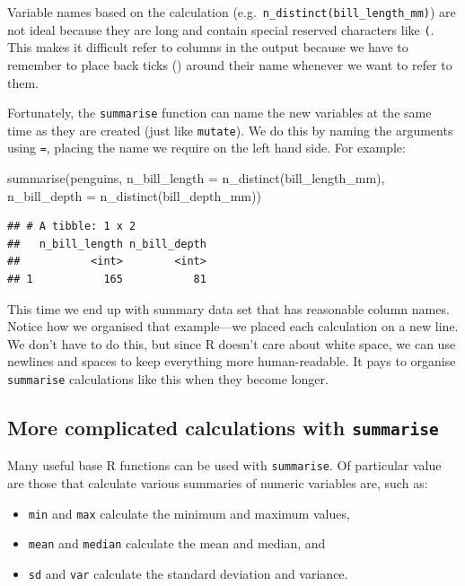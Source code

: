 \documentclass[
]{book}
\newenvironment{Shaded}{\begin{snugshade}}{\end{snugshade}}
\newcommand{\AttributeTok}[1]{\textcolor[rgb]{0.77,0.63,0.00}{#1}}
\newcommand{\FunctionTok}[1]{\textcolor[rgb]{0.00,0.00,0.00}{#1}}
\newcommand{\NormalTok}[1]{#1}
\providecommand{\tightlist}{%
  \setlength{\itemsep}{0pt}\setlength{\parskip}{0pt}}
\begin{document}
Variable names based on the calculation (e.g.~\texttt{n\_distinct(bill\_length\_mm)}) are not ideal because they are long and contain special reserved characters like \texttt{(}. This makes it difficult refer to columns in the output because we have to remember to place back ticks (\texttt{\textasciigrave{}}) around their name whenever we want to refer to them.

Fortunately, the \texttt{summarise} function can name the new variables at the same time as they are created (just like \texttt{mutate}). We do this by naming the arguments using \texttt{=}, placing the name we require on the left hand side. For example:

\begin{Shaded}
\begin{Highlighting}[]
\FunctionTok{summarise}\NormalTok{(penguins, }
          \AttributeTok{n\_bill\_length =} \FunctionTok{n\_distinct}\NormalTok{(bill\_length\_mm), }
          \AttributeTok{n\_bill\_depth  =} \FunctionTok{n\_distinct}\NormalTok{(bill\_depth\_mm))}
\end{Highlighting}
\end{Shaded}

\begin{verbatim}
## # A tibble: 1 x 2
##   n_bill_length n_bill_depth
##           <int>        <int>
## 1           165           81
\end{verbatim}

This time we end up with summary data set that has reasonable column names. Notice how we organised that example---we placed each calculation on a new line. We don't have to do this, but since R doesn't care about white space, we can use newlines and spaces to keep everything more human-readable. It pays to organise \texttt{summarise} calculations like this when they become longer.

\hypertarget{more-complicated-calculations-with-summarise}{%
\subsection{\texorpdfstring{More complicated calculations with \texttt{summarise}}{More complicated calculations with summarise}}\label{more-complicated-calculations-with-summarise}}

Many useful base R functions can be used with \texttt{summarise}. Of particular value are those that calculate various summaries of numeric variables are, such as:

\begin{itemize}
\tightlist
\item
  \texttt{min} and \texttt{max} calculate the minimum and maximum values,
\item
  \texttt{mean} and \texttt{median} calculate the mean and median, and
\item
  \texttt{sd} and \texttt{var} calculate the standard deviation and variance.
\end{itemize}
\end{document}

